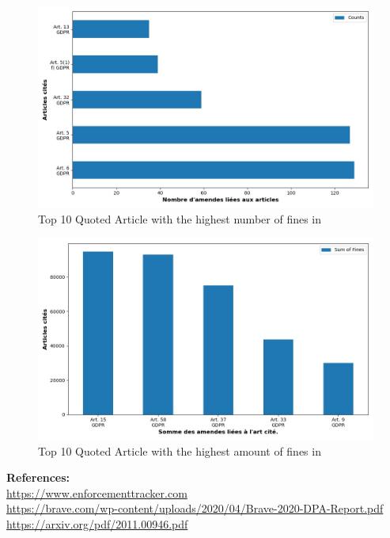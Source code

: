 \documentclass[12pt]{article}
\begin{document}
	\begin{multicols}{2}
	\begin{figure}
		[H]\centering\includegraphics[width=1.0\linewidth]{graphs/top10_quoted_year}
		\caption{Top 10 Quoted Article with the highest number of fines in }
	\end{figure}
	\begin{figure}
		[H]\centering\includegraphics[width=1\linewidth]{graphs/top10_quoted_year_fines}
		\caption{Top 10 Quoted Article with the highest amount of fines in }
	 \end{figure}
	
	\end{multicols}









\vspace*{\fill}
\textbf{References:}\\
\href{https://www.enforcementtracker.com}{https://www.enforcementtracker.com}\\
\href{https://brave.com/wp-content/uploads/2020/04/Brave-2020-DPA-Report.pdf}{https://brave.com/wp-content/uploads/2020/04/Brave-2020-DPA-Report.pdf}\\
\href{https://arxiv.org/pdf/2011.00946.pdf}{https://arxiv.org/pdf/2011.00946.pdf}
\end{document}

